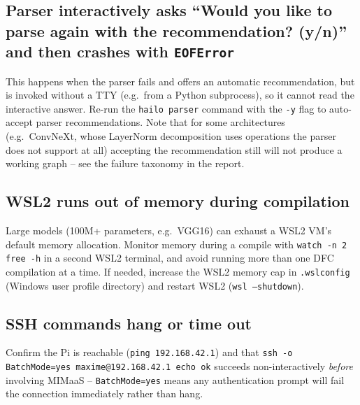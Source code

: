 \documentclass[11pt]{article}
\begin{document}
\subsection{Parser interactively asks ``Would you like to parse again with
the recommendation? (y/n)'' and then crashes with \texttt{EOFError}}
This happens when the parser fails and offers an automatic recommendation,
but is invoked without a TTY (e.g.\ from a Python subprocess), so it cannot
read the interactive answer. Re-run the \texttt{hailo parser} command with
the \texttt{-y} flag to auto-accept parser recommendations. Note that for
some architectures (e.g.\ ConvNeXt, whose LayerNorm decomposition uses
operations the parser does not support at all) accepting the recommendation
still will not produce a working graph -- see the failure taxonomy in the
report.

\subsection{WSL2 runs out of memory during compilation}
Large models (100M+ parameters, e.g.\ VGG16) can exhaust a WSL2 VM's default
memory allocation. Monitor memory during a compile with
\texttt{watch -n 2 free -h} in a second WSL2 terminal, and avoid running more
than one DFC compilation at a time. If needed, increase the WSL2 memory cap
in \texttt{.wslconfig} (Windows user profile directory) and restart WSL2
(\texttt{wsl --shutdown}).

\subsection{SSH commands hang or time out}
Confirm the Pi is reachable (\texttt{ping 192.168.42.1}) and that
\texttt{ssh -o BatchMode=yes maxime@192.168.42.1 echo ok} succeeds
non-interactively \emph{before} involving MIMaaS -- \texttt{BatchMode=yes}
means any authentication prompt will fail the connection immediately rather
than hang.
\end{document}
